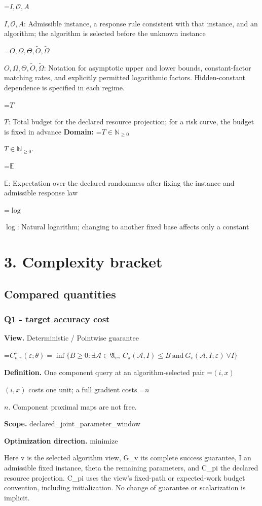 \documentclass[10pt,a4paper]{article}
\newcommand{\AtlasMath}[1]{\par\begingroup\centering\setbox0=\hbox{$\displaystyle #1$}\ifdim\wd0>1.4\linewidth\typeout{ATLAS WIDE FORMULA: \the\wd0}\fi\ifdim\wd0>\linewidth\resizebox{\linewidth}{!}{\box0}\else\box0\fi\par\endgroup}
\newcommand{\AtlasInlineMath}[1]{\begingroup\setbox0=\hbox{$#1$}\ifdim\wd0>.4\linewidth\endgroup\AtlasMath{#1}\else\endgroup$#1$\fi}
\begin{document}
\AtlasInlineMath{I,\mathcal{O},A}: Admissible instance, a response rule consistent with that instance, and an algorithm; the algorithm is selected before the unknown instance

\AtlasInlineMath{O,\Omega,\Theta,\widetilde{O},\widetilde\Omega}: Notation for asymptotic upper and lower bounds, constant-factor matching rates, and explicitly permitted logarithmic factors. Hidden-constant dependence is specified in each regime.

\AtlasInlineMath{T}: Total budget for the declared resource projection; for a risk curve, the budget is fixed in advance \textbf{Domain:} \AtlasInlineMath{T\in\mathbb{N}_{\ge0}}.

\AtlasInlineMath{\mathbb{E}}: Expectation over the declared randomness after fixing the instance and admissible response law

\AtlasInlineMath{\log}: Natural logarithm; changing to another fixed base affects only a constant

\section{3. Complexity bracket}
\subsection{Compared quantities}
\subsubsection{Q1 - target accuracy cost}
\textbf{View.} Deterministic / Pointwise guarantee

\AtlasMath{C^\star_{v,\pi}(\varepsilon;\theta)=\inf\{B\ge0:\exists\mathcal A\in\mathfrak A_v,\ C_\pi(\mathcal A,I)\le B\ \text{and}\ G_v(\mathcal A,I;\varepsilon)\ \forall I\}}
\textbf{Definition.} One component query at an algorithm-selected pair \AtlasInlineMath{(i,x)} costs one unit; a full gradient costs \AtlasInlineMath{n}. Component proximal maps are not free.

\textbf{Scope.} declared\_joint\_parameter\_window

\textbf{Optimization direction.} minimize

Here v is the selected algorithm view, G\_v its complete success guarantee, I an admissible fixed instance, theta the remaining parameters, and C\_pi the declared resource projection. C\_pi uses the view's fixed-path or expected-work budget convention, including initialization. No change of guarantee or scalarization is implicit.
\end{document}
